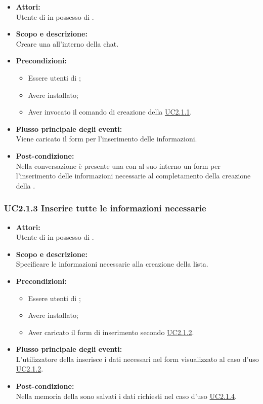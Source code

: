 \begin{itemize}
	\item \textbf{Attori:}
	\\Utente di  in possesso di \ProjectName{}.
	\item \textbf{Scopo e descrizione:} 
	\\Creare una  all'interno della chat.
	\item \textbf{Precondizioni:}
	\begin{itemize}
		\item Essere utenti di ;
		\item Avere \ProjectName{} installato;
		\item Aver invocato il comando di creazione della  \hyperref[UC2.1.1]{UC2.1.1}.
	\end{itemize}
	\item \textbf{Flusso principale degli eventi:}
	\\Viene caricato il form per l'inserimento delle informazioni.
	\item \textbf{Post-condizione:}
	\\Nella conversazione è presente una   con al suo interno un form per l'inserimento delle informazioni necessarie al completamento della creazione della .
\end{itemize}

\subsubsection{UC2.1.3 Inserire tutte le informazioni necessarie} \label{UC2.1.3}

\begin{itemize}
	\item \textbf{Attori:}
	\\Utente di  in possesso di \ProjectName{}.
	\item \textbf{Scopo e descrizione:} 
	\\Specificare le informazioni necessarie alla creazione della lista.
	\item \textbf{Precondizioni:}
	\begin{itemize}
		\item Essere utenti di ;
		\item Avere \ProjectName{} installato;
		\item Aver caricato il form di inserimento secondo \hyperref[UC2.1.2]{UC2.1.2}.
	\end{itemize}
	\item \textbf{Flusso principale degli eventi:}
	\\L'utilizzatore della  inserisce i dati necessari nel form visualizzato al caso d'uso \hyperref[UC2.1.2]{UC2.1.2}.
	\item \textbf{Post-condizione:}
	\\Nella memoria della  sono salvati i dati richiesti nel caso d'uso \hyperref[UC2.1.4]{UC2.1.4}. 
\end{itemize}

